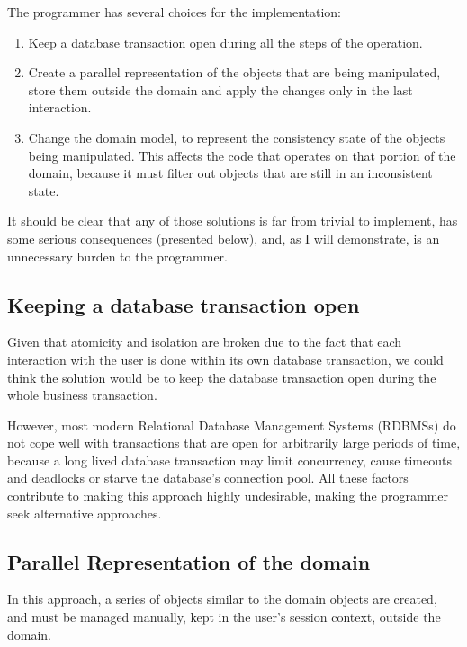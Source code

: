 The programmer has several choices for the implementation:

\begin{enumerate}
\item Keep a database transaction open during all the steps of the
  operation.

\item Create a parallel representation of the objects that are being
  manipulated, store them outside the domain and apply the changes
  only in the last interaction.

\item Change the domain model, to represent the consistency state of
  the objects being manipulated. This affects the code that operates
  on that portion of the domain, because it must filter out objects
  that are still in an inconsistent state.
\end{enumerate}

It should be clear that any of those solutions is far from trivial to
implement, has some serious consequences (presented below), and, as I
will demonstrate, is an unnecessary burden to the programmer.

\subsection{Keeping a database transaction open}

Given that atomicity and isolation are broken due to the fact that
each interaction with the user is done within its own database
transaction, we could think the solution would be to keep the database
transaction open during the whole business transaction.

However, most modern Relational Database Management Systems (RDBMSs)
do not cope well with transactions that are open for arbitrarily large
periods of time, because a long lived database transaction may limit
concurrency, cause timeouts and deadlocks or starve the database's
connection pool. All these factors contribute to making this approach
highly undesirable, making the programmer seek alternative approaches.

\subsection{Parallel Representation of the domain}

In this approach, a series of objects similar to the domain objects
are created, and must be managed manually, kept in the user's session
context, outside the domain.

